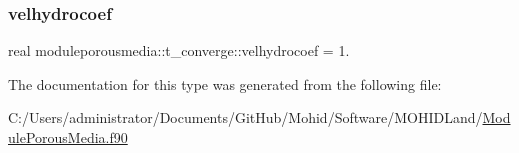\mbox{\label{structmoduleporousmedia_1_1t__converge_a95f5af950d834e7f9dc56632f492fb0c}} 
\subsubsection{\texorpdfstring{velhydrocoef}{velhydrocoef}}
{\footnotesize\ttfamily real moduleporousmedia\+::t\+\_\+converge\+::velhydrocoef = 1.\hspace{0.3cm}{\ttfamily [private]}}



The documentation for this type was generated from the following file\+:\begin{DoxyCompactItemize}
\item 
C\+:/\+Users/administrator/\+Documents/\+Git\+Hub/\+Mohid/\+Software/\+M\+O\+H\+I\+D\+Land/\mbox{\hyperlink{_module_porous_media_8f90}{Module\+Porous\+Media.\+f90}}\end{DoxyCompactItemize}
